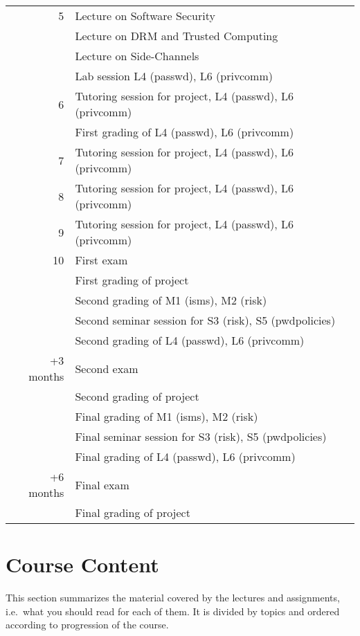 \documentclass[a4paper]{llncs}
\begin{document}
\begin{table}
\begin{tabular}{rp{9cm}}
    \midrule
    5
      & Lecture on Software Security\\
      & Lecture on DRM and Trusted Computing\\
      & Lecture on Side-Channels\\
      & Lab session L4 (passwd), L6 (privcomm)\\
    \midrule
    6
      & Tutoring session for project, L4 (passwd), L6 (privcomm)\\
      & First grading of L4 (passwd), L6 (privcomm)\\
    \midrule
    7
      & Tutoring session for project, L4 (passwd), L6 (privcomm)\\
    \midrule
    8
      & Tutoring session for project, L4 (passwd), L6 (privcomm)\\
    \midrule
    9
      & Tutoring session for project, L4 (passwd), L6 (privcomm)\\
    \midrule
    10
      & First exam\\
      & First grading of project\\
      & Second grading of M1 (isms), M2 (risk)\\
      & Second seminar session for S3 (risk), S5 (pwdpolicies)\\
      & Second grading of L4 (passwd), L6 (privcomm)\\
    \midrule
    +3 months
      & Second exam\\
      & Second grading of project\\
      & Final grading of M1 (isms), M2 (risk)\\
      & Final seminar session for S3 (risk), S5 (pwdpolicies)\\
      & Final grading of L4 (passwd), L6 (privcomm)\\
    \midrule
    +6 months
      & Final exam\\
      & Final grading of project\\
    \bottomrule
  \end{tabular}
\end{table}


\section{Course Content}

This section summarizes the material covered by the lectures and assignments, 
i.e.~what you should read for each of them.
It is divided by topics and ordered according to progression of the course.
\end{document}
